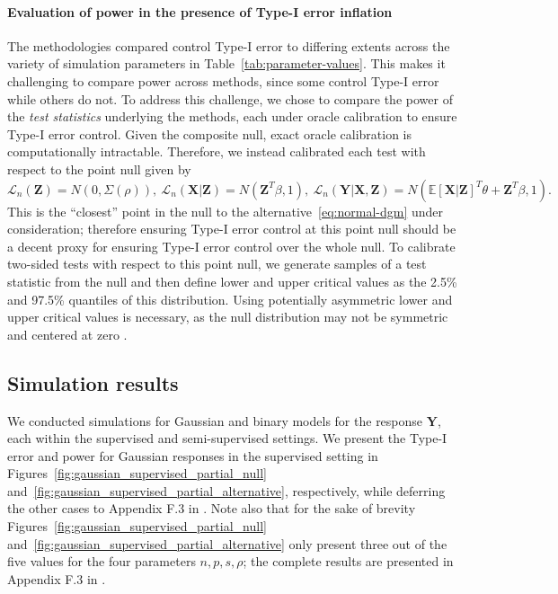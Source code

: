 \documentclass[aos]{imsart}
\theoremstyle{plain}
\theoremstyle{remark}
\newcommand{\E}{\mathbb E}								%
\newcommand{\prx}{\bm X}								%
\newcommand{\prz}{\bm Z}								%
\newcommand{\pry}{{\bm Y}}								%
\newcommand{\law}{\mathcal L}							%
\begin{document}
\paragraph*{Evaluation of power in the presence of Type-I error inflation}

The methodologies compared control Type-I error to differing extents across the variety of simulation parameters in Table~\ref{tab:parameter-values}. This makes it challenging to compare power across methods, since some control Type-I error while others do not. To address this challenge, we chose to compare the power of the \textit{test statistics} underlying the methods, each under oracle calibration to ensure Type-I error control. Given the composite null, exact oracle calibration is computationally intractable. Therefore, we instead calibrated each test with respect to the point null given by 
\begin{equation*}
    \law_n(\prz) = N(0, \Sigma(\rho)),\ \law_n(\prx | \prz) = N(\prz^T \beta, 1), \ \law_n(\pry|\prx,\prz) = N(\E[\prx|\prz]^T \theta + \prz^T \beta, 1).
\end{equation*}
This is the ``closest'' point in the null to the alternative~\eqref{eq:normal-dgm} under consideration; therefore ensuring Type-I error control at this point null should be a decent proxy for ensuring Type-I error control over the whole null. To calibrate two-sided tests with respect to this point null, we generate samples of a test statistic from the null and then define lower and upper critical values as the 2.5\% and 97.5\% quantiles of this distribution. Using potentially asymmetric lower and upper critical values is necessary, as the null distribution may not be symmetric and centered at zero \citep{Liu2022a}.

\subsection{Simulation results} \label{sec:sim-results}

We conducted simulations for Gaussian and binary models for the response $\pry$, each within the supervised and semi-supervised settings. We present the Type-I error and power for Gaussian responses in the supervised setting in Figures~\ref{fig:gaussian_supervised_partial_null} and~\ref{fig:gaussian_supervised_partial_alternative}, respectively, while deferring the other cases to Appendix F.3 in \cite{supplementary}. Note also that for the sake of brevity Figures~\ref{fig:gaussian_supervised_partial_null} and~\ref{fig:gaussian_supervised_partial_alternative} only present three out of the five values for the four parameters $n, p, s, \rho$; the complete results are presented in Appendix F.3 in \cite{supplementary}.
\end{document}
